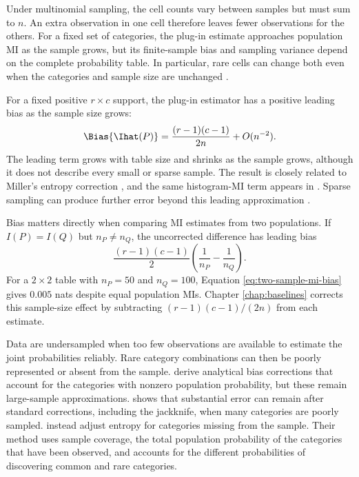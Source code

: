 Under multinomial sampling, the cell counts vary between samples but must
sum to \(n\). An extra observation in one cell therefore leaves fewer
observations for the others. For a fixed set of categories, the plug-in
estimate approaches population MI as the sample grows, but its finite-sample
bias and sampling variance depend on the complete probability table. In particular,
rare cells can change both even when the categories and sample size are
unchanged
\citep{paninski2003}.

For a fixed positive \(r\times c\) support, the plug-in estimator has a
positive leading bias as the sample size grows:
\begin{equation}
  \Bias\{\Ihat(P)\}
  =\frac{(r-1)(c-1)}{2n}+O(n^{-2}).
  \label{eq:mi-leading-bias}
\end{equation}
The leading term grows with table size and shrinks as the sample grows,
although it does not describe every small or sparse sample. The result is closely related
to Miller's entropy correction \citep{miller1955}, and the same histogram-MI
term appears in \citet{moddemeijer1989}. Sparse sampling can produce further
error beyond this leading approximation \citep{paninski2003}.

Bias matters directly when comparing MI estimates from two populations. If
\(I(P)=I(Q)\) but \(n_P\ne n_Q\), the uncorrected difference has leading bias
\begin{equation}
  \frac{(r-1)(c-1)}{2}
  \left(\frac{1}{n_P}-\frac{1}{n_Q}\right).
  \label{eq:two-sample-mi-bias}
\end{equation}
For a \(2\times2\) table with \(n_P=50\) and \(n_Q=100\), Equation
\eqref{eq:two-sample-mi-bias} gives \(0.005\) nats despite equal population MIs. Chapter
\ref{chap:baselines} corrects this sample-size effect by subtracting
\((r-1)(c-1)/(2n)\) from each estimate.

\medskip
{}

Data are undersampled when too few observations are available to estimate
the joint probabilities reliably. Rare category combinations can then be
poorly represented or absent from the sample. \citet{panzeri1996} derive
analytical bias corrections that account
for the categories with nonzero population probability, but these remain
large-sample approximations. \citet{paninski2003} shows that substantial
error can remain after standard corrections, including the jackknife,
when many categories are poorly sampled. \citet{chaoshen2003} instead
adjust entropy for categories missing from the sample. Their method uses
sample coverage, the total population probability of the categories that
have been observed, and accounts for the different probabilities of
discovering common and rare categories.


